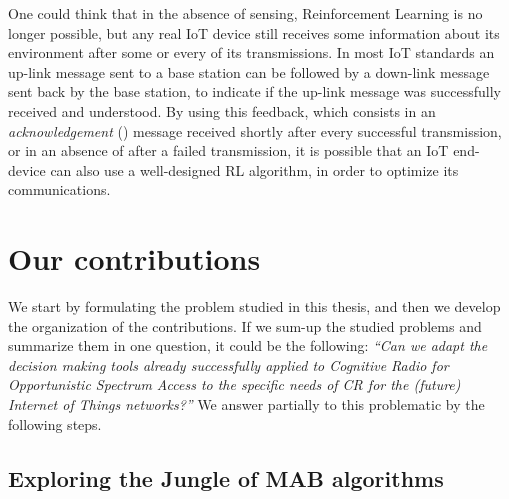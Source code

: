 One could think that in the absence of sensing, Reinforcement Learning is no longer possible, but any real IoT device still receives some information about its environment after some or every of its transmissions.
In most IoT standards an up-link message sent to a base station can be followed by a down-link message sent back by the base station, to indicate if the up-link message was successfully received and understood.
%
By using this feedback, which consists in an \emph{acknowledgement} (\Ack) message received shortly after every successful transmission, or in an absence of \Ack{} after a failed transmission, it is possible that an IoT end-device can also use a well-designed RL algorithm, in order to optimize its communications.
%


\section{Our contributions}
\label{sec:1:contributions}

We start by formulating the problem studied in this thesis, and then we develop the organization of the contributions.
%
%
If we sum-up the studied problems and summarize them in one question, it could be the following:
\emph{``Can we adapt the decision making tools already successfully applied to Cognitive Radio for Opportunistic Spectrum Access to the specific needs of CR for the (future) Internet of Things networks?''}
%
We answer partially to this problematic by the following steps.


\subsection{Exploring the Jungle of MAB algorithms}

